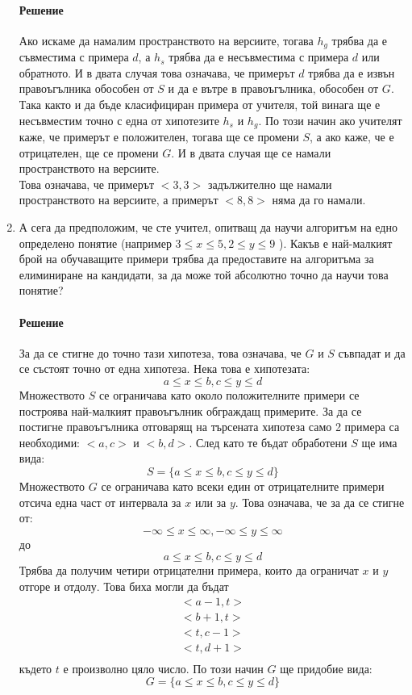 \documentclass{article}
\begin{document}
\begin{enumerate}
\paragraph{Решение}
Ако искаме да намалим пространството на версиите, тогава $h_g$ трябва да е съвместима с примера $d$, а $h_s$ трябва да е несъвместима с примера $d$ или обратното. И в двата случая това означава, че примерът $d$ трябва да е извън правоъгълника обособен от $S$ и да е вътре в правоъгълника, обособен от $G$. Така както и да бъде класифициран примера от учителя, той винага ще е несъвместим точно с една от хипотезите $h_s$ и $h_g$.
По този начин ако учителят каже, че примерът е положителен, тогава ще се промени $S$, а ако каже, че е отрицателен, ще се промени $G$. И в двата случая ще се намали пространството на версиите. \\
Това означава, че примерът $<3, 3>$ задължително ще намали пространството на версиите, а примерът $<8, 8>$ няма да го намали.
\item
А сега да предположим, че сте учител, опитващ да научи алгоритъм на едно определено понятие (например $3 \leq x \leq 5 , 2 \leq y \leq 9$ ). Какъв е най-малкият брой
на обучаващите примери трябва да предоставите на алгоритъма за
елиминиране на кандидати, за да може той абсолютно точно да научи това
понятие?
\paragraph{Решение}
За да се стигне до точно тази хипотеза, това означава, че $G$ и $S$ съвпадат и да се състоят точно от една хипотеза. Нека това е хипотезата:
\[a \leq x \leq b, c \leq y \leq d\]
Множеството $S$ се ограничава като около положителните примери се построява най-малкият правоъгълник обграждащ примерите. За да се постигне правоъгълника отговарящ на търсената хипотеза само 2 примера са необходими: $<a, c>$ и $<b, d>$. След като те бъдат обработени $S$ ще има вида:
\[S = \{a \leq x \leq b, c \leq y \leq d\}\]
Множеството $G$ се ограничава като всеки един от отрицателните примери отсича една част от интервала за $x$ или за $y$. Това означава, че за да се стигне от:
\[-\infty \leq x \leq \infty, -\infty \leq y \leq \infty\]
до
\[a \leq x \leq b, c \leq y \leq d\]
Трябва да получим четири отрицателни примера, които да ограничат $x$ и $y$ отгоре и отдолу. Това биха могли да бъдат
\[
	\begin{array}{lr}
		<a - 1, t>\\
		<b + 1, t>\\
		<t, c - 1>\\
		<t, d + 1>\\
	\end{array}
\]
където $t$ е произволно цяло число. По този начин $G$ ще придобие вида:
\[G = \{a \leq x \leq b, c \leq y \leq d\}\]
\end{enumerate}
\end{document}
